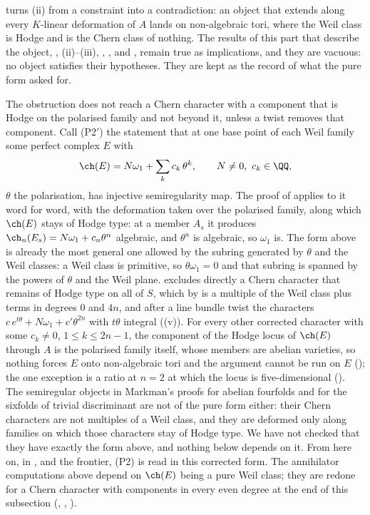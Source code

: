 \begin{remark}\label{rem:p2prime}
 turns (ii) from a constraint into a
contradiction: an object that extends along every $K$-linear deformation of
$A$ lands on non-algebraic tori, where the Weil class is Hodge and is the
Chern class of nothing. The results of this part that describe the object,
, (ii)--(iii), ,
,  and , remain true as
implications, and they are vacuous: no object satisfies their hypotheses. They
are kept as the record of what the pure form asked for.

The obstruction does not reach a Chern character with a component that is
Hodge on the polarised family and not beyond it, unless a twist removes that
component. Call
\textup{(P2$'$)} the statement that at one base point of each Weil family
some perfect complex $E$ with
\[
  \ch(E)=N\omega_{1}+\sum_{k}c_{k}\,\theta^{k},\qquad N\ne0,\ c_{k}\in\QQ,
\]
$\theta$ the polarisation, has injective semiregularity map. The proof of
 applies to it word for word, with the deformation
taken over the polarised family, along which $\ch(E)$ stays of Hodge type:
at a member $A_{s}$ it produces $\ch_{n}(E_{s})=N\omega_{1}+c_{n}\theta^{n}$
algebraic, and $\theta^{n}$ is algebraic, so $\omega_{1}$ is. The form above
is already the most general one allowed by the subring generated by $\theta$
and the Weil classes: a Weil class is primitive, so $\theta\omega_{1}=0$ and
that subring is spanned by the powers of $\theta$ and the Weil plane.
 excludes directly a Chern character that remains of Hodge
type on all of $S$, which by  is a multiple of the
Weil class plus terms in degrees $0$ and $4n$, and after a line bundle twist
the characters $c\,e^{t\theta}+N\omega_{1}+c'\theta^{2n}$ with $t\theta$
integral ((v)). For every other corrected character
with some $c_{k}\ne0$, $1\le k\le2n-1$, the component of the Hodge locus of
$\ch(E)$ through $A$ is the polarised family itself, whose members are
abelian varieties, so nothing forces $E$ onto non-algebraic tori and the
argument cannot be run on $E$ (); the one exception is
a ratio at $n=2$ at which the locus is five-dimensional
(). The semiregular objects in Markman's
proofs for abelian fourfolds and for the sixfolds of trivial discriminant
\cite{Mar25a,Mar25b} are not of the pure form either: their Chern characters
are not multiples of a Weil class, and they are deformed only along families
on which those characters stay of Hodge type. We have not checked that they
have exactly the form above, and nothing below depends on it. From here on, in
,  and the frontier, \textup{(P2)} is
read in this corrected form. The annihilator computations above depend on
$\ch(E)$ being a pure Weil class; they are redone for a Chern character with
components in every even degree at the end of this subsection
(, ,
).


\end{remark}
